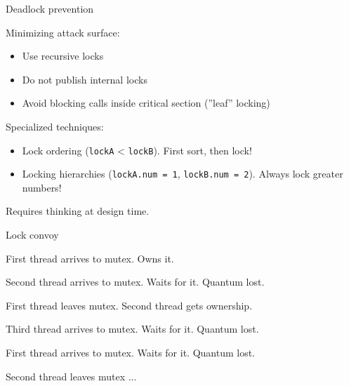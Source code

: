 \begin{frame}[t,noframenumbering]{Deadlock prevention}

Minimizing attack surface:
\begin{itemize}
    \item Use recursive locks
    \item Do not publish internal locks
    \item Avoid blocking calls inside critical section (''leaf'' locking)
\end{itemize}

\pause

Specialized techniques:
\begin{itemize}
    \item Lock ordering (\texttt{lockA} < \texttt{lockB}). First sort, then lock!
    \pause
    \item Locking hierarchies (\texttt{lockA.num = 1}, \texttt{lockB.num = 2}). Always lock greater numbers!     
    \pause
\end{itemize}
Requires thinking at design time.

\end{frame}


\begin{frame}{Lock convoy}


First thread arrives to mutex. \pause Owns it. \pause

Second thread arrives to mutex. \pause Waits for it. Quantum lost. \pause

First thread leaves mutex. \pause Second thread gets ownership. \pause

Third thread arrives to mutex. \pause Waits for it. Quantum lost. \pause

First thread arrives to mutex. \pause Waits for it. Quantum lost. \pause

Second thread leaves mutex ...

\end{frame}

\newcommand{\tmpheader}{
\begin{itemize}
    \item When you call some code, it could acquire/release arbitrary locks
    \item When your code is invoked by some thread, that thread could already own arbitrary locks    
\end{itemize}
}

